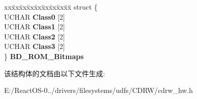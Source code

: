 \begin{DoxyCompactItemize}
\begin{tabbing}
\end{tabbing}\item 
\mbox{\label{struct___b_d___r_e_a_d___d_e_s_c_r_i_p_t_o_r_a9d7de7495755d85340ecd1d5a83f1fef}} 
\begin{tabbing}
xx\=xx\=xx\=xx\=xx\=xx\=xx\=xx\=xx\=\kill
struct \{\\
\>UCHAR {\bfseries Class0} \mbox{[}2\mbox{]}\\
\>UCHAR {\bfseries Class1} \mbox{[}2\mbox{]}\\
\>UCHAR {\bfseries Class2} \mbox{[}2\mbox{]}\\
\>UCHAR {\bfseries Class3} \mbox{[}2\mbox{]}\\
\} {\bfseries BD\_ROM\_Bitmaps}\\

\end{tabbing}\end{DoxyCompactItemize}


该结构体的文档由以下文件生成\+:\begin{DoxyCompactItemize}
\item 
E\+:/\+React\+O\+S-\/0../drivers/filesystems/udfs/\+C\+D\+R\+W/cdrw\+\_\+hw.\+h\end{DoxyCompactItemize}
